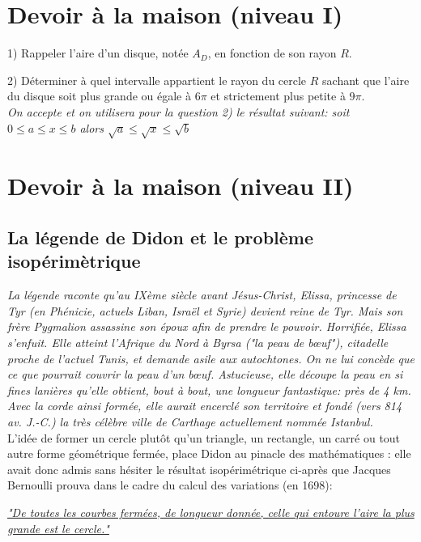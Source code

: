 \documentclass[french]{book}
\begin{document}
\thispagestyle{empty}

\section{Devoir à la maison (niveau I)}
1) Rappeler l'aire d'un disque, notée $A_D$, en fonction de son rayon $R$.

2) Déterminer à quel intervalle appartient le rayon du cercle $R$ sachant que l'aire du disque soit plus grande ou égale à  $6\pi$ et strictement plus petite à $9\pi$.\\


\textit{On accepte et on utilisera pour la question 2) le résultat suivant: soit $0 \leq a \leq x \leq b$ alors $\sqrt{a} \leq \sqrt{x} \leq \sqrt{b}$ }

\section{Devoir à la maison (niveau II)}

\subsection*{La légende de Didon et le problème isopérimètrique}

\textit{La légende raconte qu'au IXème siècle avant Jésus-Christ, Elissa, princesse de Tyr (en Phénicie, actuels Liban, Israël et Syrie) devient reine de Tyr. Mais son frère Pygmalion assassine son époux afin de prendre le pouvoir. Horrifiée, Elissa s'enfuit. Elle atteint l'Afrique du Nord à Byrsa ("la peau de bœuf"), citadelle proche de l'actuel Tunis, et demande asile aux autochtones. On ne lui concède que ce que pourrait couvrir la peau d'un bœuf. Astucieuse, elle découpe la peau en si fines lanières qu'elle obtient, bout à bout, une longueur fantastique: près de 4 km. Avec la corde ainsi formée, elle aurait encerclé son territoire et fondé (vers 814 av. J.-C.) la très célèbre ville de Carthage actuellement nommée Istanbul.}\\



L'idée de former un cercle plutôt qu'un triangle, un rectangle, un carré ou tout autre forme géométrique fermée, place Didon au pinacle des mathématiques : elle avait donc admis sans hésiter le résultat isopérimétrique ci-après que Jacques Bernoulli prouva dans le cadre du calcul des variations (en 1698):



\begin{center}

\underline{ \textit{"De toutes les courbes fermées, de longueur donnée, celle qui entoure l'aire la plus grande est le cercle."} }
\end{center}
\end{document}
